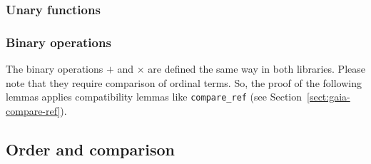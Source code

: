 \subsubsection{Unary functions}


\subsubsection{Binary operations}
The binary operations $+$ and $\times$ are defined the same way in both libraries. Please note that they require comparison of ordinal terms. So, the proof of the following lemmas applies
compatibility lemmas like \texttt{compare\_ref} (see Section~\vref{sect:gaia-compare-ref}).



\subsection{Order and comparison}

\label{sect:gaia-compare-ref}

